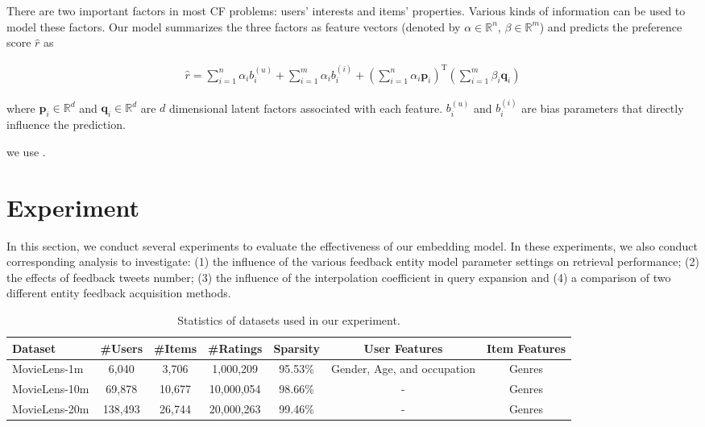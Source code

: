 \documentclass{sig-alternate-05-2015}
\begin{document}
There are two important factors in most CF problems: users' interests and items' properties.
Various kinds of information can be used to model these factors.
Our model summarizes the three factors as feature vectors (denoted by
$\alpha \in \mathbb{R}^n$, $\beta \in \mathbb{R}^m$) and predicts the preference score $\hat{r}$ as

\begin{equation}
\begin{aligned}
	\hat{r} = \sum_{i=1}^{n} \alpha_{i} b_{i}^{(u)} + \sum_{i=1}^{m} \alpha_{i} b_{i}^{(i)} +
	\left( \sum_{i=1}^{n} \alpha_{i} \textbf{p}_{i} \right) ^ \mathrm{T}
	\left( \sum_{i=1}^{m} \beta_{i} \textbf{q}_{i} \right)
\end{aligned}
\end{equation}

where $\textbf{p}_{i} \in \mathbb{R}^d$ and $\textbf{q}_{i} \in \mathbb{R}^d$
are $d$ dimensional latent factors associated with each feature.
$b_{i}^{(u)}$ and $b_{i}^{(i)}$ are bias parameters that directly influence the prediction.



we use \cite{chen2012svdfeature}.


\section{Experiment}
In this section, we conduct several experiments to evaluate the effectiveness of our embedding model.
In these experiments, we also conduct corresponding analysis to investigate:
(1) the influence of the various feedback entity model parameter settings on
retrieval performance;
(2) the effects of feedback tweets number;
(3) the influence of the interpolation coefficient in query expansion and
(4) a comparison of two different entity feedback acquisition methods.



\begin{table}[htpb]
	\centering
	\caption{Statistics of datasets used in our experiment.}
	\label{tab:topics}
	\begin{tabular}{|l|c|c|c|c|c|c|}
		\hline
		\textbf{Dataset} & \textbf{\#Users} & \textbf{\#Items} & \textbf{\#Ratings} & \textbf{Sparsity} & \textbf{User Features} & \textbf{Item Features} \\
		\hline
		MovieLens-1m  & 6,040   & 3,706  & 1,000,209  & 95.53\% & Gender, Age, and occupation & Genres \\
		MovieLens-10m & 69,878  & 10,677 & 10,000,054 & 98.66\% & - & Genres \\
		MovieLens-20m & 138,493 & 26,744 & 20,000,263 & 99.46\% & - & Genres \\
		\hline
	\end{tabular}
\end{table}
\end{document}
